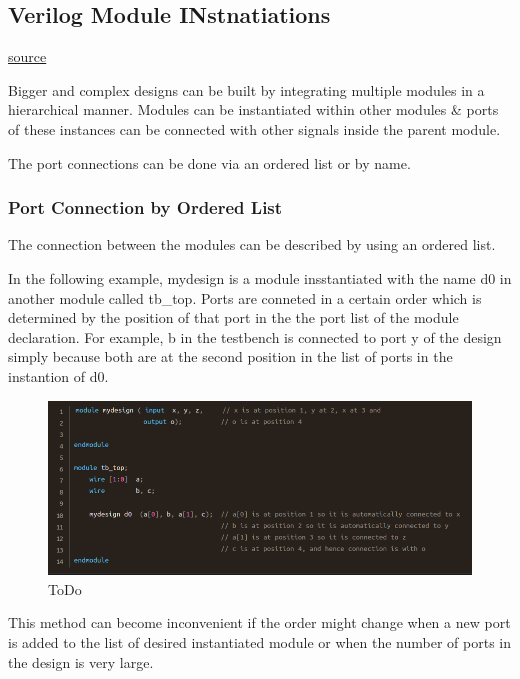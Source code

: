 \documentclass{article}
\begin{document}
	\subsection{Verilog Module INstnatiations}

	\href{https://www.chipverify.com/verilog/verilog-module-instantiations}{source}

	Bigger and complex designs can be built by integrating multiple modules in a hierarchical manner. Modules can be instantiated within other modules \& ports of these instances can be connected
	with other signals inside the parent module. \newline

	The port connections can be done via an ordered list or by name. \newline

	\subsubsection{Port Connection by Ordered List}

	The connection between the modules can be described by using an ordered list. \newline

	In the following example, mydesign is a module insstantiated with the name d0 in another module called tb_top. Ports are conneted in a certain order which is determined by the position of that port
	in the the port list of the module declaration. For example, b in the testbench is connected to port y of the design simply because both are at the second position in the list of ports in the 
	instantion of d0.

	\begin{figure}[H]
		\includegraphics[width=\linewidth]{VerilogPics/figure_32.png}
		\caption{ToDo}
		\label{ToDo}
	\end{figure}

	This method can become inconvenient if the order might change when a new port is added to the list of desired instantiated module or when the number of ports in the design is very large.
\end{document}
